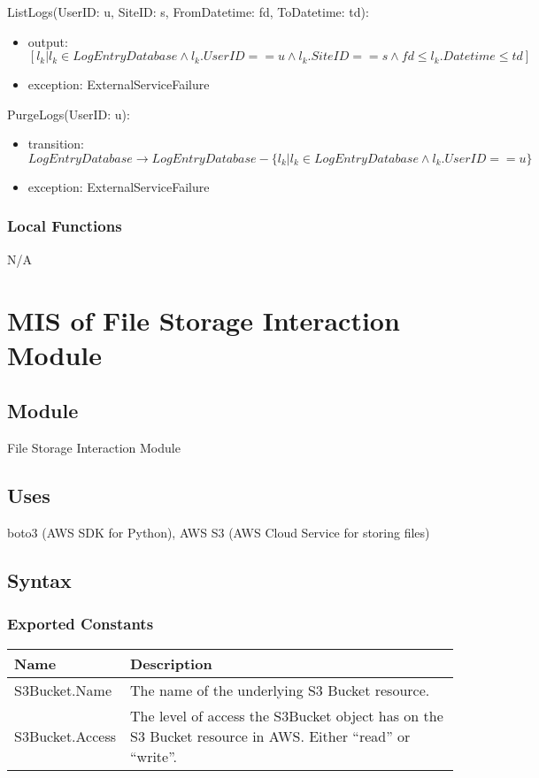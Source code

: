 \documentclass[12pt, titlepage]{article}
\begin{document}
\noindent ListLogs(UserID: u, SiteID: s, FromDatetime: fd, ToDatetime: td):
\begin{itemize}
  \item output: $[l_k | l_k \in LogEntryDatabase \land l_k.UserID ==
    u \land l_k.SiteID == s \land fd \le l_k.Datetime \le td]$
  \item exception: ExternalServiceFailure
\end{itemize}

\noindent PurgeLogs(UserID: u):
\begin{itemize}
  \item transition: $LogEntryDatabase \rightarrow LogEntryDatabase -
    \{l_k | l_k \in LogEntryDatabase \land l_k.UserID == u \}$
  \item exception: ExternalServiceFailure
\end{itemize}

\subsubsection{Local Functions}

N/A

\section{MIS of File Storage Interaction Module} \label{Module}

\subsection{Module}

File Storage Interaction Module

\subsection{Uses}

boto3 (AWS SDK for Python), AWS S3 (AWS Cloud Service for storing files)

\subsection{Syntax}

\subsubsection{Exported Constants}

\begin{center}
  \begin{tabular}{p{4cm} p{12cm}}
    \hline
    \textbf{Name} & \textbf{Description} \\
    \hline
    S3Bucket.Name & The name of the underlying S3 Bucket resource. \\
    \hline
    S3Bucket.Access & The level of access the S3Bucket object has on
    the S3 Bucket resource in AWS. Either ``read'' or ``write''. \\
    \hline
  \end{tabular}
\end{center}
\end{document}

